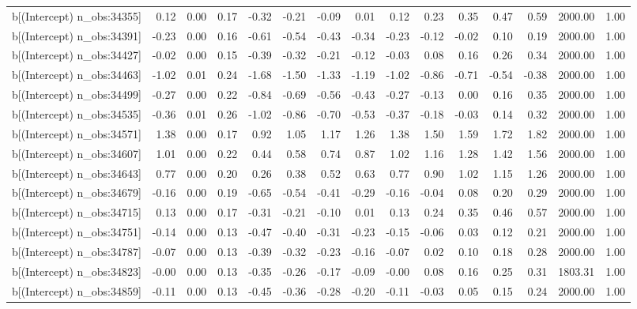 \begin{table}[ht]
\begin{tabular}{rrrrrrrrrrrrrrr}
  b[(Intercept) n\_obs:34355] & 0.12 & 0.00 & 0.17 & -0.32 & -0.21 & -0.09 & 0.01 & 0.12 & 0.23 & 0.35 & 0.47 & 0.59 & 2000.00 & 1.00 \\ 
  b[(Intercept) n\_obs:34391] & -0.23 & 0.00 & 0.16 & -0.61 & -0.54 & -0.43 & -0.34 & -0.23 & -0.12 & -0.02 & 0.10 & 0.19 & 2000.00 & 1.00 \\ 
  b[(Intercept) n\_obs:34427] & -0.02 & 0.00 & 0.15 & -0.39 & -0.32 & -0.21 & -0.12 & -0.03 & 0.08 & 0.16 & 0.26 & 0.34 & 2000.00 & 1.00 \\ 
  b[(Intercept) n\_obs:34463] & -1.02 & 0.01 & 0.24 & -1.68 & -1.50 & -1.33 & -1.19 & -1.02 & -0.86 & -0.71 & -0.54 & -0.38 & 2000.00 & 1.00 \\ 
  b[(Intercept) n\_obs:34499] & -0.27 & 0.00 & 0.22 & -0.84 & -0.69 & -0.56 & -0.43 & -0.27 & -0.13 & 0.00 & 0.16 & 0.35 & 2000.00 & 1.00 \\ 
  b[(Intercept) n\_obs:34535] & -0.36 & 0.01 & 0.26 & -1.02 & -0.86 & -0.70 & -0.53 & -0.37 & -0.18 & -0.03 & 0.14 & 0.32 & 2000.00 & 1.00 \\ 
  b[(Intercept) n\_obs:34571] & 1.38 & 0.00 & 0.17 & 0.92 & 1.05 & 1.17 & 1.26 & 1.38 & 1.50 & 1.59 & 1.72 & 1.82 & 2000.00 & 1.00 \\ 
  b[(Intercept) n\_obs:34607] & 1.01 & 0.00 & 0.22 & 0.44 & 0.58 & 0.74 & 0.87 & 1.02 & 1.16 & 1.28 & 1.42 & 1.56 & 2000.00 & 1.00 \\ 
  b[(Intercept) n\_obs:34643] & 0.77 & 0.00 & 0.20 & 0.26 & 0.38 & 0.52 & 0.63 & 0.77 & 0.90 & 1.02 & 1.15 & 1.26 & 2000.00 & 1.00 \\ 
  b[(Intercept) n\_obs:34679] & -0.16 & 0.00 & 0.19 & -0.65 & -0.54 & -0.41 & -0.29 & -0.16 & -0.04 & 0.08 & 0.20 & 0.29 & 2000.00 & 1.00 \\ 
  b[(Intercept) n\_obs:34715] & 0.13 & 0.00 & 0.17 & -0.31 & -0.21 & -0.10 & 0.01 & 0.13 & 0.24 & 0.35 & 0.46 & 0.57 & 2000.00 & 1.00 \\ 
  b[(Intercept) n\_obs:34751] & -0.14 & 0.00 & 0.13 & -0.47 & -0.40 & -0.31 & -0.23 & -0.15 & -0.06 & 0.03 & 0.12 & 0.21 & 2000.00 & 1.00 \\ 
  b[(Intercept) n\_obs:34787] & -0.07 & 0.00 & 0.13 & -0.39 & -0.32 & -0.23 & -0.16 & -0.07 & 0.02 & 0.10 & 0.18 & 0.28 & 2000.00 & 1.00 \\ 
  b[(Intercept) n\_obs:34823] & -0.00 & 0.00 & 0.13 & -0.35 & -0.26 & -0.17 & -0.09 & -0.00 & 0.08 & 0.16 & 0.25 & 0.31 & 1803.31 & 1.00 \\ 
  b[(Intercept) n\_obs:34859] & -0.11 & 0.00 & 0.13 & -0.45 & -0.36 & -0.28 & -0.20 & -0.11 & -0.03 & 0.05 & 0.15 & 0.24 & 2000.00 & 1.00 \\ 

\end{tabular}
\end{table}
